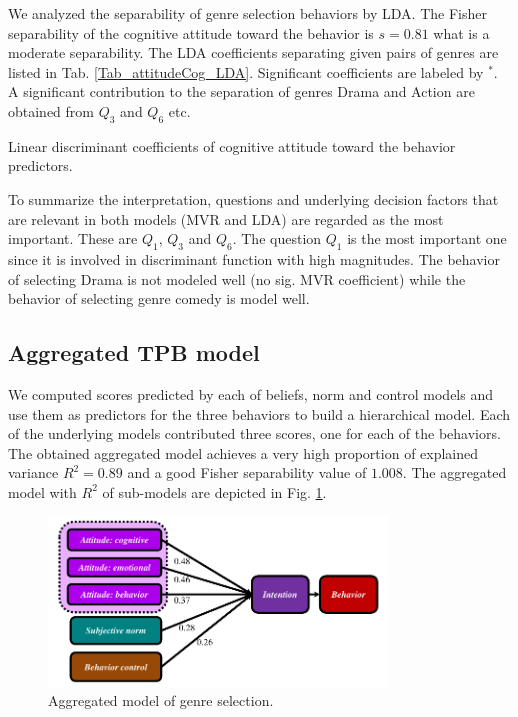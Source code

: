 \documentclass{llncs}
\begin{document}
We analyzed the separability of genre selection behaviors by LDA. The Fisher separability of the cognitive attitude toward the behavior is $s = 0.81$ what is a moderate separability. The LDA coefficients separating given pairs of genres are listed in Tab. \ref{Tab_attitudeCog_LDA}. Significant coefficients are labeled by $^*$. A significant contribution to the separation of genres Drama and Action are obtained from $Q_3$ and $Q_6$ etc. 

\begin{table}[!h]
  \centering
   
  \caption{Linear discriminant coefficients of cognitive attitude toward the behavior predictors.}
  \label{Tab_attitudeCog_LDA}
\end{table}

To summarize the interpretation, questions and underlying decision factors that are relevant in both models (MVR and LDA) are regarded as the most important. These are $Q_1$, $Q_3$ and $Q_6$. The question $Q_1$ is the most important one since it is involved in discriminant function with high magnitudes. The behavior of selecting Drama is not modeled well (no sig. MVR coefficient) while the behavior of selecting genre comedy is model well. 

\subsection{Aggregated TPB model}\label{SubSec_AggregateModel}

We computed scores predicted by each of beliefs, norm and control models and use them as predictors for the three behaviors to build a hierarchical model. Each of the underlying models contributed three scores, one for each of the behaviors. The obtained aggregated model achieves a very high proportion of explained variance $R^2=0.89$ and a good Fisher separability value of $1.008$. The aggregated model with $R^2$ of sub-models are depicted in Fig. \ref{Fig_AggregModel}. 

 \begin{figure}[h!]
 \begin{center}
   \includegraphics[width=9cm]{TpbTopH.pdf}
   \caption[Fig_AggregModel]{Aggregated  model of genre selection.}
   \label{Fig_AggregModel}
 \end{center}
 \end{figure}
\end{document}
